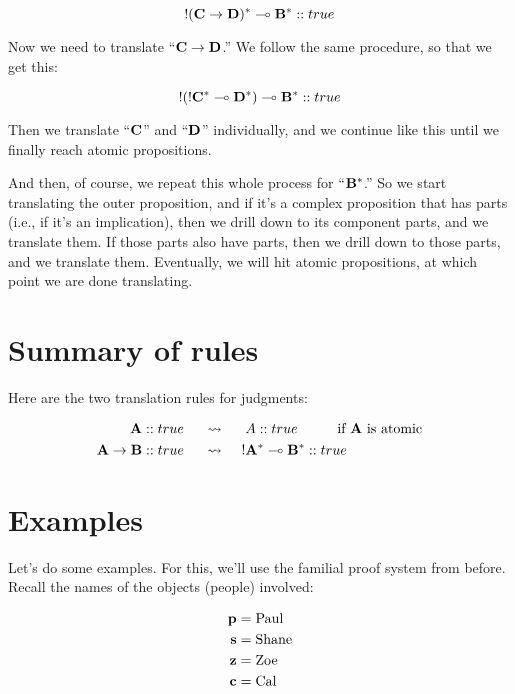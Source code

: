 \documentclass[../../../main.tex]{subfiles}
\begin{document}
\begin{equation*}
  \bang/(\nd{C \impl/ D})^{*} \lolli/ \nd{B}^{*} :: true
\end{equation*}

\noindent
Now we need to translate ``$\nd{C \impl/ D}$.'' We follow the same procedure, so that we get this:

\begin{equation*}
  \bang/(\nd{\bang/C^{*} \lolli/ D^{*}}) \lolli/ \nd{B}^{*} :: true
\end{equation*}

\noindent
Then we translate ``$\mathbf{C}$'' and ``$\mathbf{D}$'' individually, and we continue like this until we finally reach atomic propositions.

And then, of course, we repeat this whole process for ``$\mathbf{B}^{*}$.'' So we start translating the outer proposition, and if it's a complex proposition that has parts (i.e., if it's an implication), then we drill down to its component parts, and we translate them. If those parts also have parts, then we drill down to those parts, and we translate them. Eventually, we will hit atomic propositions, at which point we are done translating.


\section{Summary of rules}

Here are the two translation rules for judgments:

\begin{align*}
  \nd{A} :: true \hskip 0.5cm &\rightsquigarrow \hskip 0.5cm A :: true \hskip 1cm \text{if $\nd{A}$ is atomic} \\
  \nd{A \impl/ B} :: true \hskip 0.5cm &\rightsquigarrow \hskip 0.5cm \bang/\nd{A}^{*} \lolli/ \nd{B}^{*} :: true
\end{align*}


\section{Examples}

Let's do some examples. For this, we'll use the familial proof system from before. Recall the names of the objects (people) involved:

\begin{align*}
  \mathbf{p} &= \text{Paul} \\
  \mathbf{s} &= \text{Shane} \\
  \mathbf{z} &= \text{Zoe} \\
  \mathbf{c} &= \text{Cal}
\end{align*}
\end{document}
